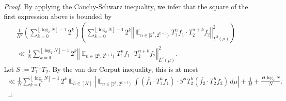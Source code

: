 \documentclass[11pt]{amsart}
\theoremstyle{definition}
\DeclareMathOperator*{\E}{\mathbb{E}}
\newcommand{\norm}[1]{\left\Vert #1\right\Vert}
\newcommand{\1}{{\mathbf{1}}}
\newcommand{\brac}[1]{\mathopen{}\left( #1 \mathclose{}\right)}
\newcommand{\floor}[1]{{\left \lfloor #1 \right \rfloor}}
\begin{document}
\begin{proof}
    By applying the Cauchy-Schwarz inequality, we infer that the square of the first expression above is bounded by
    \begin{multline*}
        \frac{1}{N^2}\left(\sum_{k=0}^{\floor{\log_2 N}-1}2^k \right)\left(\sum_{k=0}^{\floor{\log_2 N}-1} 2^k\norm{\E_{n\in[2^k,2^{k+1})} T_{1}^n f_1\cdot T_{2}^{n+k}f_2}_{L^2(\mu)}^2\right)\\
        \ll \frac{1}{N}\sum_{k=0}^{\floor{\log_2 N}-1} 2^k\norm{\E_{n\in[2^k,2^{k+1})} T_{1}^n f_1\cdot T_{2}^{n+k}f_2}_{L^2(\mu)}^2.
    \end{multline*}
    Let $S:=T_{1}^{-1}T_{2}$.
    By the van der Corput inequality, this is at most 
    \begin{multline*}
       \ll\frac{1}{N}\sum_{k=0}^{\floor{\log_2 N}-1} 2^k\E_{h\in[H]}\left| \E_{n\in[2^k,2^{k+1})}\int(\overline{f_1}\cdot T_1^h f_1)\cdot S^n T_2^k(\overline{f_2}\cdot T_2^{h} f_2) \, d\mu\right|+ {\frac{1}{H}+\frac{H\log_2 N}{N}}.
    \end{multline*}





\end{proof}
\end{document}
